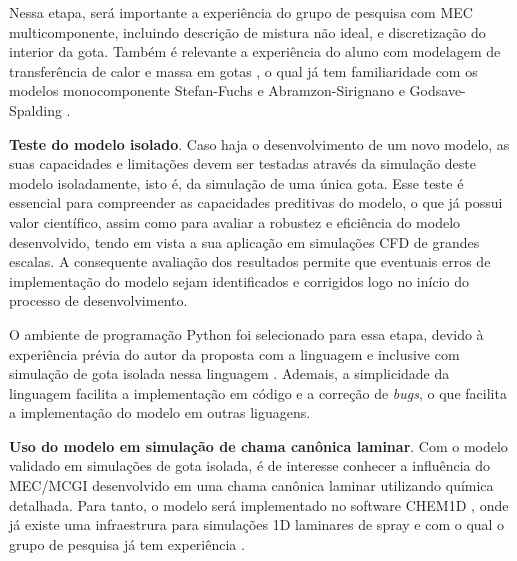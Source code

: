 Nessa etapa, será importante a experiência do grupo de pesquisa com MEC multicomponente, incluindo descrição de mistura não ideal, e discretização do interior da gota.
Também é relevante a experiência do aluno com modelagem de transferência de calor e massa em gotas \cite{HenningsJ2024MT}, o qual já tem familiaridade com os modelos monocomponente Stefan-Fuchs \cite{Glassman2008} e Abramzon-Sirignano \cite{Sirignano1989} e Godsave-Spalding \cite{Law1978}.

\textbf{Teste do modelo isolado}.
Caso haja o desenvolvimento de um novo modelo, as suas capacidades e limitações devem ser testadas através da simulação deste modelo isoladamente, isto é, da simulação de uma única gota.
Esse teste é essencial para compreender as capacidades preditivas do modelo, o que já possui valor científico, assim como para avaliar a robustez e eficiência do modelo desenvolvido, tendo em vista a sua aplicação em simulações CFD de grandes escalas.
A consequente avaliação dos resultados permite que eventuais erros de implementação do modelo sejam identificados e corrigidos logo no início do processo de desenvolvimento.

O ambiente de programação Python foi selecionado para essa etapa, devido à experiência prévia do autor da proposta com a linguagem e inclusive com simulação de gota isolada nessa linguagem \cite{HenningsJ2024MT}.
Ademais, a simplicidade da linguagem facilita a implementação em código e a correção de \emph{bugs}, o que facilita a implementação do modelo em outras liguagens.

\textbf{Uso do modelo em simulação de chama canônica laminar}.
Com o modelo validado em simulações de gota isolada, é de interesse conhecer a influência do MEC/MCGI desenvolvido em uma chama canônica laminar utilizando química detalhada.
Para tanto, o modelo será implementado no software CHEM1D \cite{Sommers1994PhD}, onde já existe uma infraestrura para simulações 1D laminares de spray \cite{Sommers1994PhD,vanOijen2002CTM,vanOijen2016PECS, SacomanoF2018CTM,SacomanoF2021Fluids} e com o qual o grupo de pesquisa já tem experiência \cite{SacomanoF2018CTM,SacomanoF2019IJHMT,SacomanoF2021Fluids,SacomanoF2024CF,SacomanoF2025CF}.

